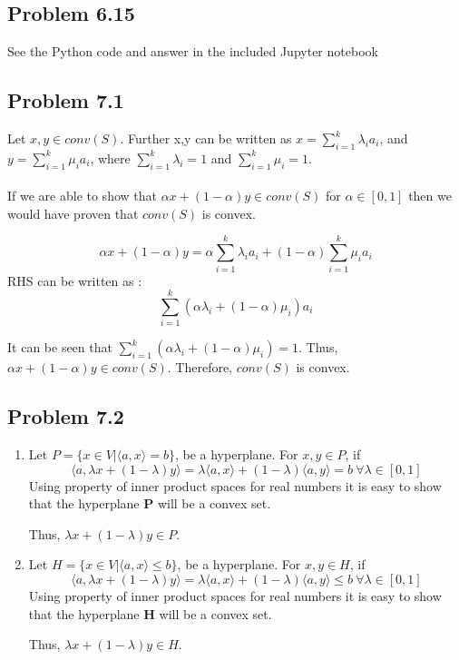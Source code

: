 \documentclass[letterpaper,12pt]{article}
\theoremstyle{definition}
\begin{document}
\subsection*{Problem 6.15}

See the Python code and answer in the included Jupyter notebook

\subsection*{Problem 7.1}

Let $x,y \in conv(S)$. Further x,y can be written as $x = \sum_{i=1}^{k} \lambda_i a_i $, and $y = \sum_{i=1}^{k} \mu_i a_i$, where $\sum_{i=1}^{k} \lambda_i =1 $ and $ \sum_{i=1}^{k} \mu_i = 1 $.\\\\
If we are able to show that $\alpha x + (1-\alpha) y \in conv(S)$ for $\alpha \in [0,1]$ then we would have proven that $conv(S)$  is convex.

\begin{equation*}
\alpha x + (1-\alpha) y = \alpha\sum_{i=1}^{k} \lambda_ia_i   + (1-\alpha)\sum_{i=1}^{k}\mu_i a_i 
\end{equation*}
RHS can be written as :
\begin{equation*}
\sum_{i=1}^{k} (\alpha\lambda_i  + (1-\alpha)\mu_i) a_i 
\end{equation*}
\begin{flushleft}
It can be seen that $\sum_{i=1}^{k} ( \alpha \lambda_i   + (1-\alpha)\mu_i)  = 1$. Thus, $\alpha x + (1- \alpha) y \in conv(S)$. Therefore, $ conv(S)$ is convex.
\end{flushleft}


\subsection*{Problem 7.2}
\begin{enumerate}
\item
Let $ P = \{x \in V | \langle a,x\rangle = b\}$, be a hyperplane. For  $x,y \in P $,  if
\begin{equation*}
\langle a,\lambda x + (1-\lambda)y\rangle=\lambda\langle a,x\rangle + (1-\lambda)\langle a,y\rangle = b  \  \forall \lambda \in [0,1]
\end{equation*}
Using property of inner product spaces for real numbers it is easy to show that the hyperplane \textbf{P} will be a convex set. 

Thus, $\lambda x + (1-\lambda)y \in P$. 

\item
Let $ H = \{x \in V | \langle a,x\rangle \leq b\}$, be a hyperplane. For  $x,y \in H $,  if
\begin{equation*}
\langle a,\lambda x + (1-\lambda)y\rangle=\lambda\langle a,x\rangle + (1-\lambda)\langle a,y\rangle \leq b  \  \forall \lambda \in [0,1]
\end{equation*}
Using property of inner product spaces for real numbers it is easy to show that the hyperplane \textbf{H} will be a convex set. 

Thus, $\lambda x + (1-\lambda)y \in H$. 

\end{enumerate}
\end{document}
